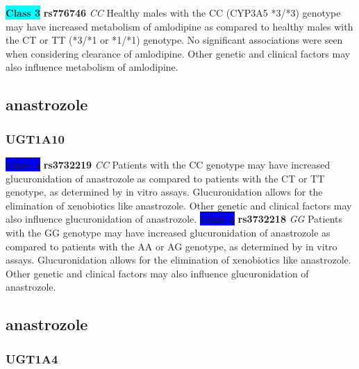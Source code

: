 \documentclass{book}
\begin{document}
\begin{center}
\textbf{\colorbox{cyan} {Class 3}} \textbf{ rs776746 } \textit{ CC }
Healthy males with the CC (CYP3A5 *3/*3) genotype may have increased metabolism of amlodipine as compared to healthy males with the CT or TT (*3/*1 or *1/*1) genotype. No significant associations were seen when considering clearance of amlodipine. Other genetic and clinical factors may also influence metabolism of amlodipine.


\end{center}\subsection{ anastrozole }


\subsubsection{ UGT1A10 }

\begin{center}

\textbf{\colorbox{blue} {Class 4}} \textbf{ rs3732219 } \textit{ CC }
Patients with the CC genotype may have increased glucuronidation of anastrozole as compared to patients with the CT or TT genotype, as determined by in vitro assays. Glucuronidation allows for the elimination of xenobiotics like anastrozole. Other genetic and clinical factors may also influence glucuronidation of anastrozole. \textbf{\colorbox{blue} {Class 4}} \textbf{ rs3732218 } \textit{ GG }
Patients with the GG genotype may have increased glucuronidation of anastrozole as compared to patients with the AA or AG genotype, as determined by in vitro assays. Glucuronidation allows for the elimination of xenobiotics like anastrozole. Other genetic and clinical factors may also influence glucuronidation of anastrozole.

\end{center}\subsection{ anastrozole }


\subsubsection{ UGT1A4 }
\end{document}
